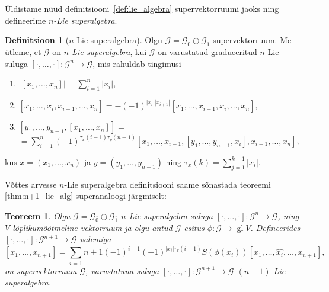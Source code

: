 \documentclass[12pt,a4paper]{article}
\theoremstyle{plain}
\newtheorem{thm}{Teoreem}[section]
\theoremstyle{definition}
\newtheorem{dfn}{Definitsioon}[section]
\newcommand{\G}{\mathcal{G}}
\DeclareMathOperator{\gl}{gl}
\newcommand{\col}{\colon}
\newcommand{\arr}{\rightarrow}
\newcommand{\nbrac}[2]{\ensuremath{\left[ #1, \dots, #2 \right]}}
\begin{document}
Üldistame nüüd definitsiooni~\ref{def:lie_algebra} supervektorruumi jaoks
ning defineerime \emph{$n$-Lie superalgebra}.

\begin{dfn}[$n$-Lie superalgebra]
    Olgu $\G = \G_{\overline{0}} \oplus \G_{\overline{1}}$ 
    supervektorruum. Me ütleme, et $\G$ on
    \emph{$n$-Lie superalgebra}, kui $\G$ on varustatud
    gradueeritud $n$-Lie suluga $\nbrac{\cdot}{\cdot} \col \G^n \arr \G$,
    mis rahuldab tingimusi
    \begin{enumerate}
        \item $\left| \nbrac{x_1}{x_n} \right| = \sum_{i=1}^n |x_i| $,
        \item $\left[ x_1, \dots, x_i, x_{i+1}, \dots, x_n \right] =
            -(-1)^{|x_i| |x_{i+1}|} \left[
                x_1, \dots, x_{i+1}, x_i, \dots, x_n
            \right]$,
        \item $\left[ y_1, \dots, y_{n-1}, \nbrac{x_1}{x_n} \right] = $ \\
            $ = \sum_{i=1}^n (-1)^{\tau_x (i-1) \tau_y (n-1)}
            \left[
                x_1, \dots, x_{i-1},
                \left[ y_1, \dots, y_{n-1}, x_i \right],
                x_{i+1}, \dots, x_n
            \right] $,
    \end{enumerate}
    kus $x = (x_1, \dots, x_n)$ ja $y = (y_1, \dots, y_{n-1})$ ning
    $\tau_x (k) = \sum_{j=1}^{k-1} |x_i|$.
\end{dfn}

Võttes arvesse $n$-Lie superalgebra definitsiooni saame sõnastada 
teoreemi \ref{thm:n+1_lie_alg} superanaloogi järgmiselt:

\begin{thm}
    Olgu $\G = \G_{\overline{0}} \oplus \G_{\overline{1}}$
    $n$-Lie superalgebra suluga $\nbrac{\cdot}{\cdot} \col \G^n \arr \G$,
    ning $V$ lõplikumõõtmeline vektorruum ja olgu
    antud $\G$ esitus $\phi \col \G \arr \gl V$. Defineerides
    $\nbrac{\cdot}{\cdot} \col \G^{n+1} \arr \G$ valemiga
    \[
        \nbrac{x_1}{x_{n+1}} = \sum_{i=1}{n+1}
        (-1)^{i-1} (-1)^{|x_i| \tau_x (i-1)} S(\phi(x_i))
        \left[ x_1, \dots, \hat{x_i}, \dots, x_{n+1} \right],
    \]
    on supervektorruum $\G$, varustatuna suluga
    $\nbrac{\cdot}{\cdot} \col \G^{n+1} \arr \G$ $(n+1)$-Lie
    superalgebra.
\end{thm}



\end{document}
